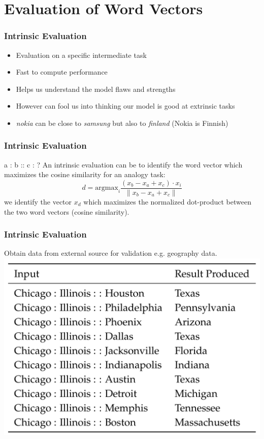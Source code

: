 \section{Evaluation of Word Vectors}
\frame{\tableofcontents[currentsection]}

\begin{frame}
	\frametitle{Intrinsic Evaluation}
	\begin{itemize}[<+->]
		\item Evaluation on a specific intermediate task
		\item Fast to compute performance
		\item Helps us understand the model flaws and strengths
		\item However can fool us into thinking our model is good at extrinsic tasks
		\item {\it nokia} can be close to {\it samsung} but also to {\it finland} (Nokia is Finnish)
	\end{itemize}
\end{frame}


\begin{frame}
	\frametitle{Intrinsic Evaluation}
	\begin{block}{a : b :: c : ?}
	An intrinsic evaluation can be to identify the word vector which maximizes the cosine similarity for an analogy task:
	\[ d = \textrm{argmax}_i \frac{ (x_b - x_a + x_c) \cdot x_i }{ \| x_b - x_a + x_c \| } \]	
	we identify the vector $x_d$ which maximizes the normalized dot-product between the two word vectors (cosine similarity).	
	\end{block}
\end{frame}

\begin{frame}
	\frametitle{Intrinsic Evaluation}
Obtain data from external source for validation e.g. geography data.
	\centering
	\includegraphics[scale=0.4]{figures/wordvectors/intrinsiceval1.png}
\end{frame}


